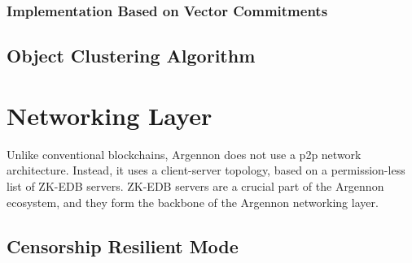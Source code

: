 \subsubsection[Implementation]{Implementation Based on Vector Commitments}\label{subsubsec:impl-zk-edbs}


\subsection{Object Clustering Algorithm}\label{subsec:clustering}




\section{Networking Layer}\label{sec:networking-layer}

Unlike conventional blockchains, Argennon does not use a p2p network architecture. Instead, it uses a
client-server topology, based on a permission-less list of ZK-EDB servers. ZK-EDB servers are a
crucial part of the Argennon ecosystem, and they form the backbone of the Argennon networking layer.


\subsection{Censorship Resilient Mode}\label{subsec:cens-res-mode}



